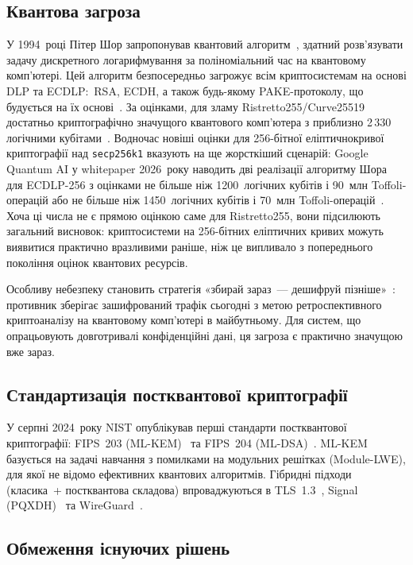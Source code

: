 \documentclass{llncs}
\begin{document}
\subsection{Квантова загроза}

У 1994~році Пітер Шор запропонував квантовий алгоритм~\cite{shor1994},
здатний розв'язувати задачу дискретного логарифмування за
поліноміальний час на квантовому комп'ютері. Цей алгоритм безпосередньо
загрожує всім криптосистемам на основі DLP та ECDLP:~RSA, ECDH, а
також будь-якому PAKE-протоколу, що будується на їх
основі~\cite{bernstein2017}. За оцінками, для зламу
Ristretto255/Curve25519 достатньо криптографічно значущого квантового
комп'ютера з приблизно 2\,330 логічними кубітами~\cite{roetteler2017}.
Водночас новіші оцінки для 256-бітної еліптичнокривої криптографії над
\texttt{secp256k1} вказують на ще жорсткіший сценарій: Google Quantum AI
у whitepaper 2026~року наводить дві реалізації алгоритму Шора для
ECDLP-256 з оцінками не більше ніж 1200~логічних кубітів і
90~млн Toffoli-операцій або не більше ніж 1450~логічних кубітів і
70~млн Toffoli-операцій~\cite{babbush2026}. Хоча ці числа не є прямою
оцінкою саме для Ristretto255, вони підсилюють загальний висновок:
криптосистеми на 256-бітних еліптичних кривих можуть виявитися
практично вразливими раніше, ніж це випливало з попереднього покоління
оцінок квантових ресурсів.

Особливу небезпеку становить стратегія «збирай зараз~--- дешифруй
пізніше»~\cite{mosca2018}: противник зберігає зашифрований трафік
сьогодні з метою ретроспективного криптоаналізу на квантовому
комп'ютері в майбутньому. Для систем, що опрацьовують довготривалі
конфіденційні дані, ця загроза є практично значущою вже зараз.

\subsection{Стандартизація постквантової криптографії}

У серпні 2024~року NIST опублікував перші стандарти постквантової
криптографії: FIPS~203 (ML-KEM)~\cite{fips203} та FIPS~204
(ML-DSA)~\cite{fips204}. ML-KEM базується на задачі навчання з
помилками на модульних решітках (Module-LWE), для якої не відомо
ефективних квантових алгоритмів. Гібридні підходи (класика~+ постквантова складова)
впроваджуються в TLS~1.3~\cite{stebila2024}, Signal
(PQXDH)~\cite{brendel2020} та WireGuard~\cite{hulsing2021}.

\subsection{Обмеження існуючих рішень}
\end{document}
